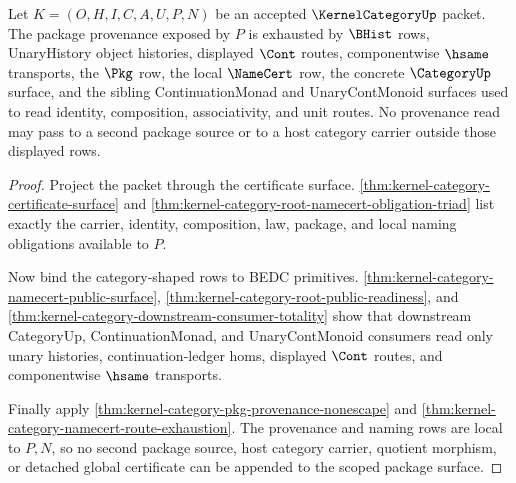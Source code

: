 \begin{theorem}
\label{thm:kernel-category-scoped-package-provenance-surface}
Let $K=(O,H,I,C,A,U,P,N)$ be an accepted $\KernelCategoryUp$ packet. The package provenance exposed by $P$ is exhausted by $\BHist$ rows, UnaryHistory object histories, displayed $\Cont$ routes, componentwise $\hsame$ transports, the $\Pkg$ row, the local $\NameCert$ row, the concrete $\CategoryUp$ surface, and the sibling ContinuationMonad and UnaryContMonoid surfaces used to read identity, composition, associativity, and unit routes. No provenance read may pass to a second package source or to a host category carrier outside those displayed rows.
\end{theorem}
\begin{proof}
Project the packet through the certificate surface. \autoref{thm:kernel-category-certificate-surface} and \autoref{thm:kernel-category-root-namecert-obligation-triad} list exactly the carrier, identity, composition, law, package, and local naming obligations available to $P$.

Now bind the category-shaped rows to BEDC primitives. \autoref{thm:kernel-category-namecert-public-surface}, \autoref{thm:kernel-category-root-public-readiness}, and \autoref{thm:kernel-category-downstream-consumer-totality} show that downstream CategoryUp, ContinuationMonad, and UnaryContMonoid consumers read only unary histories, continuation-ledger homs, displayed $\Cont$ routes, and componentwise $\hsame$ transports.

Finally apply \autoref{thm:kernel-category-pkg-provenance-nonescape} and \autoref{thm:kernel-category-namecert-route-exhaustion}. The provenance and naming rows are local to $P,N$, so no second package source, host category carrier, quotient morphism, or detached global certificate can be appended to the scoped package surface.
\end{proof}

